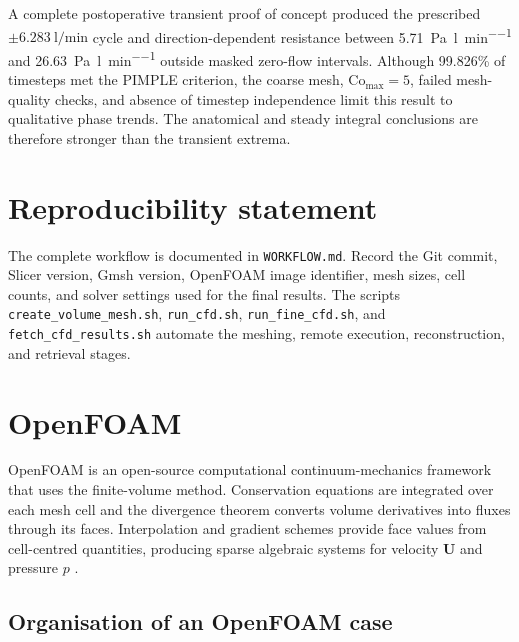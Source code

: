 \documentclass[11pt,a4paper]{article}
\begin{document}
A complete postoperative transient proof of concept produced the prescribed
$\pm\SI{6.283}{\litre\per\minute}$ cycle and direction-dependent resistance
between \SI{5.71}{\pascal\per\litre\per\minute} and
\SI{26.63}{\pascal\per\litre\per\minute} outside masked zero-flow intervals.
Although 99.826\% of timesteps met the PIMPLE criterion, the coarse mesh,
$\mathrm{Co}_{\max}=5$, failed mesh-quality checks, and absence of timestep
independence limit this result to qualitative phase trends. The anatomical and
steady integral conclusions are therefore stronger than the transient extrema.

\section*{Reproducibility statement}

The complete workflow is documented in \texttt{WORKFLOW.md}. Record the Git
commit, Slicer version, Gmsh version, OpenFOAM image identifier, mesh sizes,
cell counts, and solver settings used for the final results. The scripts
\texttt{create\_volume\_mesh.sh}, \texttt{run\_cfd.sh},
\texttt{run\_fine\_cfd.sh}, and \texttt{fetch\_cfd\_results.sh} automate the
meshing, remote execution, reconstruction, and retrieval stages.

\clearpage
\appendix

\section{OpenFOAM}
\label{app:openfoam}

OpenFOAM is an open-source computational continuum-mechanics framework that
uses the finite-volume method. Conservation equations are integrated over each
mesh cell and the divergence theorem converts volume derivatives into fluxes
through its faces. Interpolation and gradient schemes provide face values from
cell-centred quantities, producing sparse algebraic systems for velocity
$\mathbf{U}$ and pressure $p$ \cite{openfoam}.

\subsection{Organisation of an OpenFOAM case}
\end{document}
